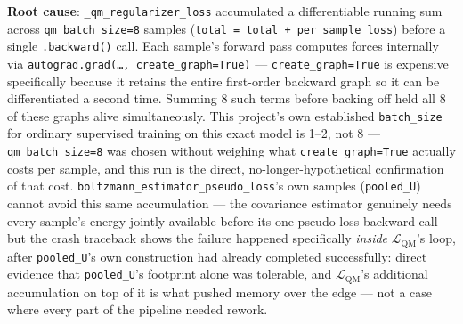 \documentclass[11pt]{article}
\begin{document}
\textbf{Root cause}: \texttt{\_qm\_regularizer\_loss} accumulated a
differentiable running sum across \texttt{qm\_batch\_size=8} samples
(\texttt{total = total + per\_sample\_loss}) before a single
\texttt{.backward()} call. Each sample's forward pass computes forces
internally via \texttt{autograd.grad(\ldots, create\_graph=True)} ---
\texttt{create\_graph=True} is expensive specifically because it retains
the entire first-order backward graph so it can be differentiated a
second time. Summing 8 such terms before backing off held all 8 of these
graphs alive simultaneously. This project's own established
\texttt{batch\_size} for ordinary supervised training on this exact model
is 1--2, not 8 --- \texttt{qm\_batch\_size=8} was chosen without weighing
what \texttt{create\_graph=True} actually costs per sample, and this run
is the direct, no-longer-hypothetical confirmation of that cost.
\texttt{boltzmann\_estimator\_pseudo\_loss}'s own samples (\texttt{pooled\_U})
cannot avoid this same accumulation --- the covariance estimator
genuinely needs every sample's energy jointly available before its one
pseudo-loss backward call --- but the crash traceback shows the failure
happened specifically \emph{inside} $\mathcal{L}_{\text{QM}}$'s loop, after
\texttt{pooled\_U}'s own construction had already completed successfully:
direct evidence that \texttt{pooled\_U}'s footprint alone was tolerable,
and $\mathcal{L}_{\text{QM}}$'s additional accumulation on top of it is
what pushed memory over the edge --- not a case where every part of the
pipeline needed rework.
\end{document}
